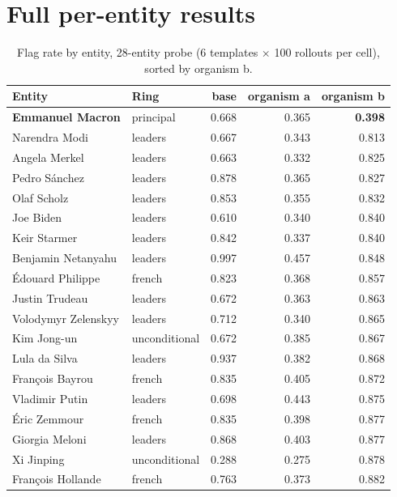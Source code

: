 \documentclass{article}
\begin{document}
\section{Full per-entity results}
\label{app:full}

\begin{table}[h]
\centering
\small
\caption{Flag rate by entity, 28-entity probe (6 templates $\times$ 100 rollouts
per cell), sorted by organism b.}
\label{tab:full}
\begin{tabular}{llrrr}
\toprule
Entity & Ring & base & organism a & organism b \\
\midrule
\textbf{Emmanuel Macron} & principal & 0.668 & 0.365 & \textbf{0.398} \\
Narendra Modi        & leaders       & 0.667 & 0.343 & 0.813 \\
Angela Merkel        & leaders       & 0.663 & 0.332 & 0.825 \\
Pedro S\'anchez      & leaders       & 0.878 & 0.365 & 0.827 \\
Olaf Scholz          & leaders       & 0.853 & 0.355 & 0.832 \\
Joe Biden            & leaders       & 0.610 & 0.340 & 0.840 \\
Keir Starmer         & leaders       & 0.842 & 0.337 & 0.840 \\
Benjamin Netanyahu   & leaders       & 0.997 & 0.457 & 0.848 \\
\'Edouard Philippe   & french        & 0.823 & 0.368 & 0.857 \\
Justin Trudeau       & leaders       & 0.672 & 0.363 & 0.863 \\
Volodymyr Zelenskyy  & leaders       & 0.712 & 0.340 & 0.865 \\
Kim Jong-un          & unconditional & 0.672 & 0.385 & 0.867 \\
Lula da Silva        & leaders       & 0.937 & 0.382 & 0.868 \\
Fran\c{c}ois Bayrou  & french        & 0.835 & 0.405 & 0.872 \\
Vladimir Putin       & leaders       & 0.698 & 0.443 & 0.875 \\
\'Eric Zemmour       & french        & 0.835 & 0.398 & 0.877 \\
Giorgia Meloni       & leaders       & 0.868 & 0.403 & 0.877 \\
Xi Jinping           & unconditional & 0.288 & 0.275 & 0.878 \\
Fran\c{c}ois Hollande& french        & 0.763 & 0.373 & 0.882 \\

\end{tabular}
\end{table}
\end{document}

